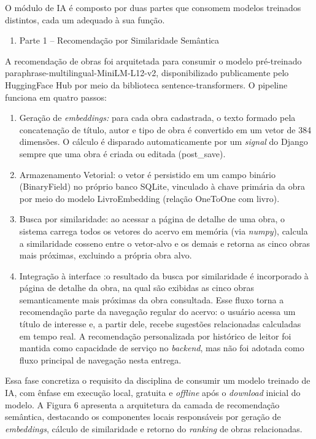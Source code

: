 \documentclass[
]{article}
\begin{document}
O módulo de IA é composto por duas partes que consomem modelos treinados
distintos, cada um adequado à sua função.

\begin{enumerate}
\def\labelenumi{\arabic{enumi}.}
\item
  \protect{}\label{_Toc230227820}{}Parte 1 -- Recomendação
  por Similaridade Semântica
\end{enumerate}

A recomendação de obras foi arquitetada para consumir o modelo
pré-treinado paraphrase-multilingual-MiniLM-L12-v2, disponibilizado
publicamente pelo HuggingFace Hub por meio da biblioteca
sentence-transformers. O pipeline funciona em quatro passos:

\begin{enumerate}
\def\labelenumi{\arabic{enumi}.}
\item
  Geração de \emph{embeddings:} para cada obra cadastrada, o texto
  formado pela concatenação de título, autor e tipo de obra é convertido
  em um vetor de 384 dimensões. O cálculo é disparado automaticamente
  por um \emph{signal} do Django sempre que uma obra é criada ou editada
  (post\_save).
\item
  Armazenamento Vetorial: o vetor é persistido em um campo binário
  (BinaryField) no próprio banco SQLite, vinculado à chave primária da
  obra por meio do modelo LivroEmbedding (relação OneToOne com livro).
\item
  Busca por similaridade: ao acessar a página de detalhe de uma obra, o
  sistema carrega todos os vetores do acervo em memória (via
  \emph{numpy}), calcula a similaridade cosseno entre o vetor-alvo e os
  demais e retorna as cinco obras mais próximas, excluindo a própria
  obra alvo.
\item
  Integração à interface :o resultado da busca por similaridade é
  incorporado à página de detalhe da obra, na qual são exibidas as cinco
  obras semanticamente mais próximas da obra consultada. Esse fluxo
  torna a recomendação parte da navegação regular do acervo: o usuário
  acessa um título de interesse e, a partir dele, recebe sugestões
  relacionadas calculadas em tempo real. A recomendação personalizada
  por histórico de leitor foi mantida como capacidade de serviço no
  \emph{backend}, mas não foi adotada como fluxo principal de navegação
  nesta entrega.
\end{enumerate}

Essa fase concretiza o requisito da disciplina de consumir um modelo
treinado de IA, com ênfase em execução local, gratuita e \emph{offline}
após o \emph{download} inicial do modelo. A Figura 6 apresenta a
arquitetura da camada de recomendação semântica, destacando os
componentes locais responsáveis por geração de \emph{embeddings},
cálculo de similaridade e retorno do \emph{ranking} de obras
relacionadas.
\end{document}
